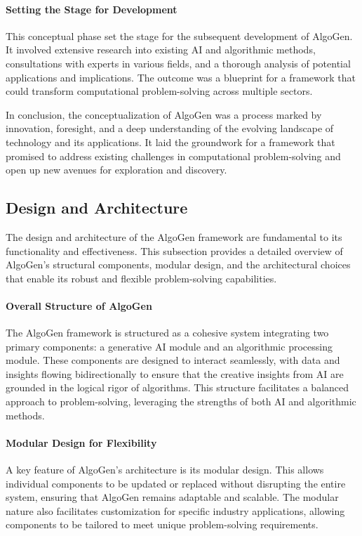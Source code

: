 \documentclass{article}
\begin{document}
\paragraph{Setting the Stage for Development}
This conceptual phase set the stage for the subsequent development of AlgoGen. It involved extensive research into existing AI and algorithmic methods, consultations with experts in various fields, and a thorough analysis of potential applications and implications. The outcome was a blueprint for a framework that could transform computational problem-solving across multiple sectors.

In conclusion, the conceptualization of AlgoGen was a process marked by innovation, foresight, and a deep understanding of the evolving landscape of technology and its applications. It laid the groundwork for a framework that promised to address existing challenges in computational problem-solving and open up new avenues for exploration and discovery.



\subsection{Design and Architecture}

The design and architecture of the AlgoGen framework are fundamental to its functionality and effectiveness. This subsection provides a detailed overview of AlgoGen’s structural components, modular design, and the architectural choices that enable its robust and flexible problem-solving capabilities.

\paragraph{Overall Structure of AlgoGen}
The AlgoGen framework is structured as a cohesive system integrating two primary components: a generative AI module and an algorithmic processing module. These components are designed to interact seamlessly, with data and insights flowing bidirectionally to ensure that the creative insights from AI are grounded in the logical rigor of algorithms. This structure facilitates a balanced approach to problem-solving, leveraging the strengths of both AI and algorithmic methods.

\paragraph{Modular Design for Flexibility}
A key feature of AlgoGen’s architecture is its modular design. This allows individual components to be updated or replaced without disrupting the entire system, ensuring that AlgoGen remains adaptable and scalable. The modular nature also facilitates customization for specific industry applications, allowing components to be tailored to meet unique problem-solving requirements.
\end{document}
